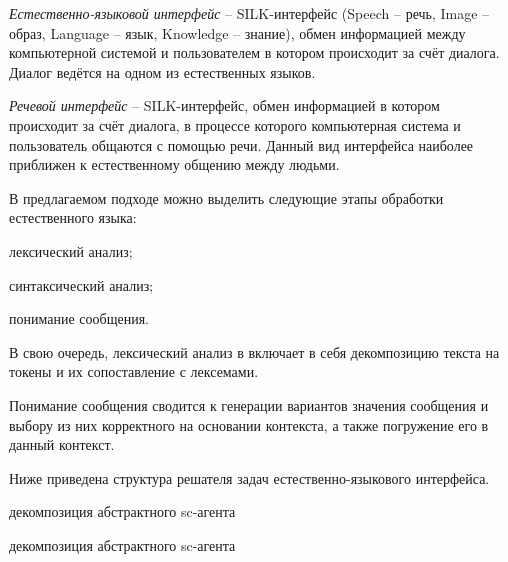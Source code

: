 \textit{Естественно-языковой интерфейс} -- SILK-интерфейс (Speech – речь, Image – образ, Language – язык, Knowledge – знание), обмен информацией между компьютерной системой и пользователем в котором происходит за счёт диалога. Диалог ведётся на одном из естественных языков.

\begin{SCn}


\end{SCn}

\textit{Речевой интерфейс} -- SILK-интерфейс, обмен информацией в котором происходит за счёт диалога, в процессе которого компьютерная система и пользователь общаются с помощью речи. Данный вид интерфейса наиболее приближен к естественному общению между людьми.

В предлагаемом подходе можно выделить следующие этапы обработки естественного языка:
\begin{textitemize}
    \item лексический анализ;
    \item синтаксический анализ;
    \item понимание сообщения.
\end{textitemize}

В свою очередь, лексический анализ в включает в себя декомпозицию текста на токены и их сопоставление с лексемами.

Понимание сообщения сводится к генерации вариантов значения сообщения и выбору из них корректного на основании контекста, а также погружение его в данный контекст.

Ниже приведена структура решателя задач естественно-языкового интерфейса.

\begin{SCn}

    \begin{scnrelfromset}{декомпозиция абстрактного sc-агента}
        \begin{scnindent}
            \begin{scnrelfromset}{декомпозиция абстрактного sc-агента}
            \end{scnrelfromset}
        \end{scnindent}
    \end{scnrelfromset}

\end{SCn}

